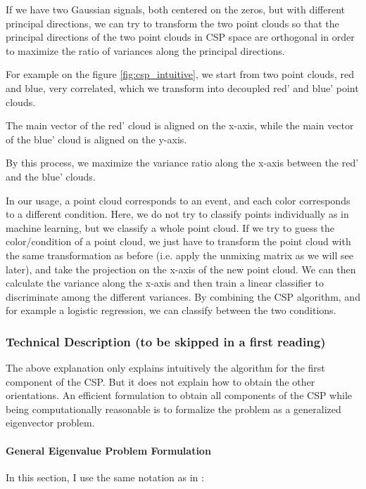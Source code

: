 If we have two Gaussian signals, both centered on the zeros, but with different principal directions, we can try to transform the two point clouds so that the principal directions of the two point clouds in CSP space are orthogonal in order to maximize the ratio of variances along the principal directions.

For example on the figure \ref{fig:csp_intuitive}, we start from two point clouds, red and blue, very correlated, which we transform into decoupled red' and blue' point clouds.

The main vector of the red' cloud is aligned on the x-axis, while the main vector of the blue' cloud is aligned on the y-axis.

By this process, we maximize the variance ratio along the x-axis between the red' and the blue' clouds.

In our usage, a point cloud corresponds to an event, and each color corresponds to a different condition. Here, we do not try to classify points individually as in machine learning, but we classify a whole point cloud. If we try to guess the color/condition of a point cloud, we just have to transform the point cloud with the same transformation as before (i.e. apply the unmixing matrix as we will see later), and take the projection on the x-axis of the new point cloud. We can then calculate the variance along the x-axis and then train a linear classifier to discriminate among the different variances. By combining the CSP algorithm, and for example a logistic regression, we can classify between the two conditions.

\subsubsection{Technical Description (to be skipped in a first reading)}

The above explanation only explains intuitively the algorithm for the first component of the CSP. But it does not explain how to obtain the other orientations. An efficient formulation to obtain all components of the CSP while being computationally reasonable is to formalize the problem as a generalized eigenvector problem.

\paragraph{General Eigenvalue Problem Formulation}

In this section, I use the same notation as in \cite{koles1991quantitative}:


